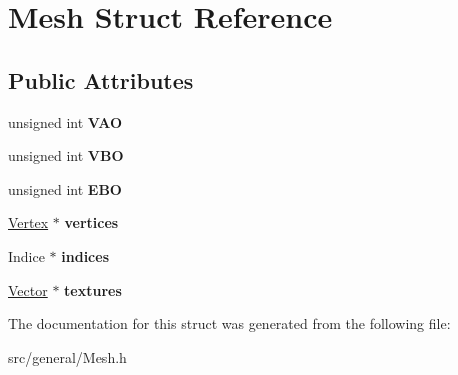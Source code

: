 \hypertarget{struct_mesh}{}\section{Mesh Struct Reference}
\label{struct_mesh}
\subsection*{Public Attributes}
\begin{DoxyCompactItemize}
\item 
\mbox{\label{struct_mesh_a79afa055e485fb65b1a7aa5b8eda2940}} 
unsigned int {\bfseries V\+AO}
\item 
\mbox{\label{struct_mesh_af08e5f92b0cf587817841104c16fa803}} 
unsigned int {\bfseries V\+BO}
\item 
\mbox{\label{struct_mesh_a25262f446aea3107da7c23f126a81faa}} 
unsigned int {\bfseries E\+BO}
\item 
\mbox{\label{struct_mesh_aaab3bc90baf629029813e0812dbeec74}} 
\mbox{\hyperlink{struct_vertex}{Vertex}} $\ast$ {\bfseries vertices}
\item 
\mbox{\label{struct_mesh_a3172afeb42dcf13647b929a599eeb175}} 
Indice $\ast$ {\bfseries indices}
\item 
\mbox{\label{struct_mesh_a63b75c5a984feaa9b28c216e9b82c6f3}} 
\mbox{\hyperlink{struct_vector}{Vector}} $\ast$ {\bfseries textures}
\end{DoxyCompactItemize}


The documentation for this struct was generated from the following file\+:\begin{DoxyCompactItemize}
\item 
src/general/Mesh.\+h\end{DoxyCompactItemize}
